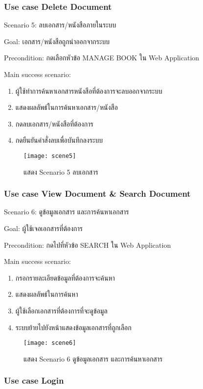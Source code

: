 \subsubsection{Use case Delete Document}

Scenario 5: ลบเอกสาร/หนังสือภายในระบบ

Goal: เอกสาร/หนังสือถูกนำออกจากระบบ

Precondition: กดเลือกหัวข้อ MANAGE BOOK ใน Web Application

Main success scenario:

\begin{enumerate}
    \item ผู้ใช้ทำการค้นหาเอกสารหนังสือที่ต้องการจะลบออกจากระบบ
    \item แสดงผลลัพธ์ในการค้นหาเอกสาร/หนังสือ
    \item กดลบเอกสาร/หนังสือที่ต้องการ
    \item กดยืนยันคำสั่งลบเพื่อบันทึกลงระบบ
\end{enumerate}
\begin{figure}[H]
    \centering
    \texttt{[image: scene5]}
    \caption{แสดง Scenario 5 ลบเอกสาร}\label{fig:scene5}
\end{figure}

\subsubsection{Use case View Document \& Search Document}

Scenario 6: ดูข้อมูลเอกสาร และการค้นหาเอกสาร

Goal: ผู้ใช้เจอเอกสารที่ต้องการ

Precondition: กดไปที่หัวข้อ SEARCH ใน Web Application

Main success scenario:

\begin{enumerate}
    \item กรอกรายละเอียดข้อมูลที่ต้องการจะค้นหา
    \item แสดงผลลัพธ์ในการค้นหา
    \item ผู้ใช้เลือกเอกสารที่ต้องการที่จะดูข้อมูล
    \item ระบบย้ายไปยังหน้าแสดงข้อมูลเอกสารที่ถูกเลือก
\end{enumerate}
\begin{figure}[H]
    \centering
    \texttt{[image: scene6]}
    \caption{แสดง Scenario 6 ดูข้อมูลเอกสาร และการค้นหาเอกสาร}\label{fig:scene6}
\end{figure}

\subsubsection{Use case Login}

